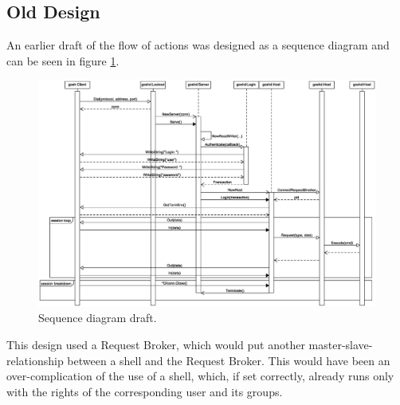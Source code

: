 \documentclass[10pt,a4paper,titlepage,twoside,english,final]{zhawreprt}
\begin{document}
\newpage
\subsection{Old Design}\label{ssec:OldDesign}
An earlier draft of the flow of actions was designed as a sequence diagram and can be seen in figure \ref{fig:SeqDiaOriginal}.
\begin{figure}[ht]
\includegraphics[width=\textwidth]{SequenceDiagram}
\caption{Sequence diagram draft.}
\label{fig:SeqDiaOriginal}
\end{figure}

This design used a \gls{Request Broker}, which would put another master-slave-relationship between a \gls{shell} and the \gls{Request Broker}. This would have been an over-complication of the use of a \gls{shell}, which, if set correctly, already runs only with the rights of the corresponding user and its groups.
\end{document}
